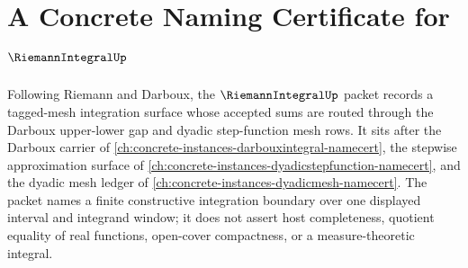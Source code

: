 \chapter{A Concrete Naming Certificate for $\RiemannIntegralUp$}
\label{ch:concrete-instances-riemannintegral-namecert}

Following Riemann and Darboux, the $\RiemannIntegralUp$ packet records a tagged-mesh integration surface whose accepted sums are routed through the Darboux upper-lower gap and dyadic step-function mesh rows. It sits after the Darboux carrier of \autoref{ch:concrete-instances-darbouxintegral-namecert}, the stepwise approximation surface of \autoref{ch:concrete-instances-dyadicstepfunction-namecert}, and the dyadic mesh ledger of \autoref{ch:concrete-instances-dyadicmesh-namecert}. The packet names a finite constructive integration boundary over one displayed interval and integrand window; it does not assert host completeness, quotient equality of real functions, open-cover compactness, or a measure-theoretic integral.

